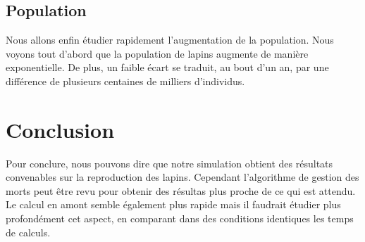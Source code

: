 \documentclass[11)pt,a4paper]{article}
\begin{document}
    \subsection{Population}
        Nous allons enfin étudier rapidement l'augmentation de la population. Nous voyons tout d'abord que la population de lapins augmente de manière exponentielle.
        De plus, un faible écart se traduit, au bout d'un an, par une différence de plusieurs centaines de milliers d'individus.
        \begin{center}
    \end{center}
\section{Conclusion}
Pour conclure, nous pouvons dire que notre simulation obtient des résultats convenables sur la reproduction des lapins. Cependant l'algorithme de gestion des morts peut être revu pour obtenir des résultas plus proche de ce qui est attendu.
Le calcul en amont semble également plus rapide mais il faudrait étudier plus profondément cet aspect, en comparant dans des conditions identiques les temps de calculs.
\end{document}

